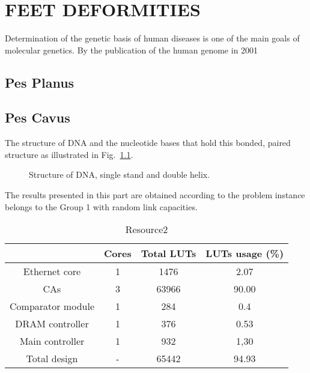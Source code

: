 \chapter{FEET DEFORMITIES}\label{chp:Feet Deformities}

Determination of the genetic basis of human diseases is one of the main goals of molecular genetics. By the publication of the human genome in 2001

\section{Pes Planus}
\section{Pes Cavus}

The structure of DNA and the nucleotide bases that hold this bonded, paired structure as illustrated in Fig.~\ref{fig:DNAhelical}.

\begin{figure}[htbp]
\centering
{}
\caption{Structure of DNA, single stand and double helix.}
\label{fig:DNAhelical}
\end{figure}

The results presented in this part are obtained according to the
problem instance belongs to the Group 1 with random link capacities.

\begin{table}[htbp]
\begin{center}
\caption{Resource2}
\vspace{23pt}
      \begin{tabular}{|c|c|c|c|}
        \hline
           & \textbf{Cores}  & \textbf{Total LUTs}   &  \textbf{LUTs usage (\%)}\\
           \hline
        Ethernet core & 1 & 1476 & 2.07\\
        \hline
        CAs & 3 & 63966  & 90.00\\
        \hline
        Comparator module  & 1 &  284   &  0.4      \\
        \hline
        DRAM controller    & 1 &  376   &  0.53       \\
        \hline
        Main controller    & 1 &  932   &  1,30         \\
        \hline
        Total design & -  & 65442    & 94.93\\
        \hline
      \end{tabular}
\label{tab:table2}
\end{center}
\end{table}

